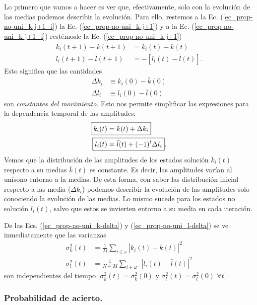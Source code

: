 \documentclass[a4paper,11pt]{article} %
\numberwithin{equation}{section}
\def\lc{\left[}
\def\rc{\right]}
\begin{document}
Lo primero que vamos a hacer es ver que, efectivamente, solo con la evolución de las medias podemos describir la evolución. 
Para ello, restemos a la Ec. (\ref{ec_prop-no-uni_k-j+1_i}) la Ec. (\ref{ec_prop-no-uni_k-j+1}) y a la Ec. (\ref{ec_prop-no-uni_k-j+1_i}) restémosle la Ec. (\ref{ec_prop-no-uni_k-j+1})
\begin{align*}
k_i(t+1) - \bar{k}(t+1) & = k_i(t) - \bar{k}(t) \\
l_i(t+1) - \bar{l}(t+1) & = - \lc l_i(t) - \bar{l}(t) \rc.
\end{align*}
Esto significa que las cantidades
\begin{align}
\Delta k_i & \equiv k_i(0) - \bar{k}(0) \\
\Delta l_i & \equiv l_i(0) - \bar{l}(0) 
\end{align}
son \textit{constantes del movimiento}. Esto nos permite simplificar las expresiones para la dependencia temporal de las amplitudes:
\begin{align}
\Aboxed{k_i(t) & = \bar{k}(t) + \Delta k_i} \label{ec_prop-no-uni_k-delta}\\
\Aboxed{l_i(t) & = \bar{l}(t) + (-1)^t \Delta l_i}. \label{ec_prop-no-uni_l-delta}
\end{align}
Vemos que  la distribución de las amplitudes de los estados solución $k_i(t)$ respecto a su medias $\bar{k}(t)$ es constante. Es decir, las amplitudes varían al unísono entorno a la medias. De esta forma, con saber las distribución inicial respecto a las medía ($\Delta k_i$) podemos describir la evolución de las amplitudes solo conociendo la evolución de las medias. Lo mismo sucede para los estados no solución $l_i(t)$, salvo que estos se invierten entorno a su media en cada iteración.

De las Ecs. (\ref{ec_prop-no-uni_k-delta}) y (\ref{ec_prop-no-uni_l-delta}) se ve inmediatamente que las varianzas
\begin{align*}
\sigma_k^2 (t) & = \frac{1}{M} \sum_{i \in \omega} |k_i(t) - \bar{k}(t)|^2   \\
\sigma_l^2 (t) & = \frac{1}{N-M} \sum_{i \in \omega^\perp} |l_i(t) - \bar{l}(t)|^2 
\end{align*}
son independientes del tiempo [$\sigma_k^2 (t) = \sigma_k^2 (0)$ y $\sigma_l^2 (t)=\sigma_l^2 (0)$ $ \forall t$].



\subsubsection{Probabilidad de acierto.} \label{subsec_prop-no-uni_Pt}
\end{document}
